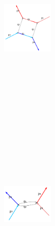 \documentclass[
  11pt,
  a4paper,
  DIV=11,
  numbers=noendperiod,
  twoside]{scrreprt}
\DeclareRobustCommand{\[}{\begin{equation}}
\DeclareRobustCommand{\]}{\end{equation}}
\begin{document}
\begin{figure}
\begin{minipage}[t]{0.20\linewidth}
{\begin{figure}[H]
{}

\end{figure}

}

\end{minipage}%
%
\begin{minipage}[t]{0.20\linewidth}

{\centering 

\begin{figure}[H]

{\centering \includegraphics[width=1in,height=3.5in]{./scattering_files/figure-latex/dot-figure-7.png}

}

\end{figure}

}

\end{minipage}%
%
\begin{minipage}[t]{0.20\linewidth}

{\centering 

\begin{figure}[H]

{\centering \includegraphics[width=1in,height=3.5in]{./scattering_files/figure-latex/dot-figure-6.png}

}
\end{figure}}
\end{minipage}
\end{figure}
\end{document}
